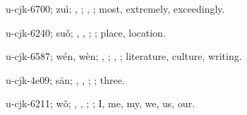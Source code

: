 \begin{multicols}{2}
{\cjkgGlue{}u-cjk-6700; zuì; \cjkgGlue{}\cjkgGlue{}\cjkgGlue{}, \cjkgGlue{}; \cjkgGlue{}, \cjkgGlue{}; most, extremely, exceedingly.

\cjkgGlue{}u-cjk-6240; suǒ; \cjkgGlue{}, \cjkgGlue{}, \cjkgGlue{}; \cjkgGlue{}; place, location.

\cjkgGlue{}u-cjk-6587; wén, wèn; \cjkgGlue{}, \cjkgGlue{}; \cjkgGlue{}, \cjkgGlue{}; literature, culture, writing.

\cjkgGlue{}u-cjk-4e09; sān; \cjkgGlue{}, \cjkgGlue{}\cjkgGlue{}\cjkgGlue{}, \cjkgGlue{}\cjkgGlue{}\cjkgGlue{}; \cjkgGlue{}; three.

\cjkgGlue{}u-cjk-6211; wǒ; \cjkgGlue{}, \cjkgGlue{}\cjkgGlue{}\cjkgGlue{}, \cjkgGlue{}; \cjkgGlue{}; I, me, my, we, us, our.

}
\end{multicols}
